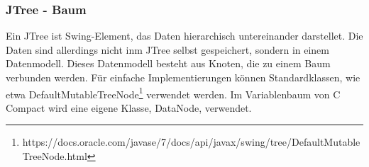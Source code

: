 \subsubsection{JTree - Baum}
Ein JTree ist Swing-Element, das Daten hierarchisch untereinander darstellet. Die Daten sind allerdings nicht inm JTree selbst gespeichert, sondern in einem Datenmodell. Dieses Datenmodell besteht aus Knoten, die zu einem Baum verbunden werden. Für einfache Implementierungen können Standardklassen, wie etwa DefaultMutableTreeNode\footnote{https://docs.oracle.com/javase/7/docs/api/javax/swing/tree/DefaultMutableTreeNode.html} verwendet werden. Im Variablenbaum von C Compact wird eine eigene Klasse, DataNode, verwendet.
